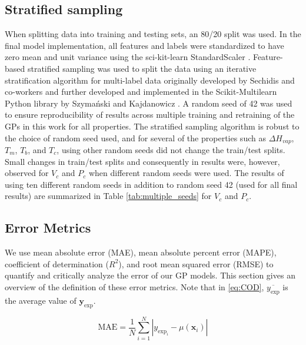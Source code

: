 \documentclass[journal=jacsat,manuscript=article, ]{achemso}
\newcommand{\alltodo}[1]{{\color{Cyan} (\texttt{alltodo}: #1)}}
\begin{document}
\subsection{Stratified sampling}
When splitting data into training and testing sets, an 80/20 split was used. In the final model implementation, all features and labels were standardized to have zero mean and unit variance using the sci-kit-learn StandardScaler \cite{scikit-learn}. 
Feature-based stratified sampling was used to split the data using an iterative stratification algorithm for multi-label data originally developed by Sechidis and co-workers \cite{sechidis2011stratification} and further developed and implemented in the Scikit-Multilearn Python library by Szymański and Kajdanowicz \cite{pmlr-v74-szymański17a}. 
A random seed of 42 was used to ensure reproducibility of results across multiple training and retraining of the GPs in this work for all properties. The stratified sampling algorithm is robust to the choice of random seed used, and for several of the properties such as  $\Delta H_{vap}$, $T_m$, $T_b$, and $T_c$, using other random seeds did not change the train/test splits. Small changes in train/test splits and consequently in results were, however, observed for $V_c$ and $P_c$ when different random seeds were used. The results of using ten different random seeds in addition to random seed 42 (used for all final results) are summarized in Table \ref{tab:multiple_seeds} for $V_c$ and $P_c$.

\subsection{Error Metrics}
We use mean absolute error (MAE), mean absolute percent error (MAPE), coefficient of determination ($R^2$), and root mean squared error (RMSE) to quantify and critically analyze the error of our GP models. This section gives an overview of the definition of these error metrics. Note that in \eqref{eq:COD}, $\overline{y_{\text{exp}}}$ is the average value of $\mathbf{y}_{\text{exp}}$. 

\begin{equation}
    \text{MAE} = \frac{1}{N} \sum_{i=1}^{N} \left| y_{\text{exp}_i} - \mu(\mathbf{x}_i) \right|
    \label{eq:MAE}
\end{equation}

\end{document}
